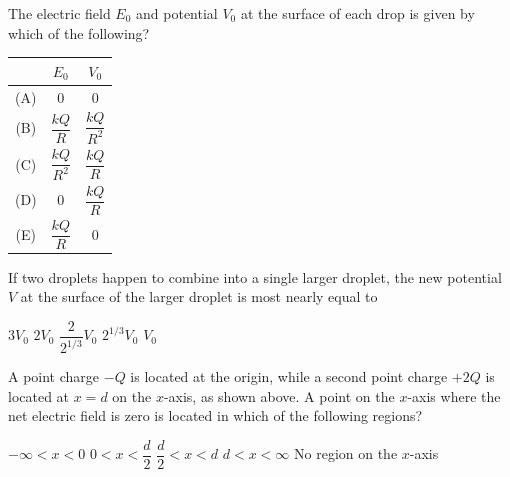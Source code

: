 \documentclass[12pt]{../../oss-apphys-exam}
\begin{document}
\begin{questions}

  \question The electric field $E_0$ and potential $V_0$ at the surface of each
  drop is given by which of the following?
  \label{rain1}
  
  \begin{tabular}{ccc}
    & $E_0$ & $V_0$ \\ \hline
    (A) & 0 & 0 \\
    (B) & $\dfrac{kQ}R$ & $\dfrac{kQ}{R^2}$ \\
    (C) & $\dfrac{kQ}{R^2}$ & $\dfrac{kQ}R$ \\
    (D) & 0 & $\dfrac{kQ}R$ \\
    (E) & $\dfrac{kQ}R$ & 0
  \end{tabular}
  
  \question If two droplets happen to combine into a single larger droplet, the
  new potential $V$ at the surface of the larger droplet is most nearly equal to
  \label{rain2}
  \begin{choices}
    \choice $3V_0$
    \choice $2V_0$
    \choice $\dfrac2{2^{1/3}}V_0$
    \choice $2^{1/3}V_0$
    \choice $V_0$
  \end{choices}
  \newpage
  
  \question A point charge $-Q$ is located at the origin, while a second point
  charge $+2Q$ is located at $x=d$ on the $x$-axis, as shown above. A point on
  the $x$-axis where the net electric field is zero is located in which of the
  following regions?
  \begin{choices}
    \choice $-\infty<x<0$
    \choice $0<x<\dfrac d2$
    \choice $\dfrac d2<x<d$
    \choice $d<x<\infty$
    \choice No region on the $x$-axis
  \end{choices}
  

\end{questions}
\end{document}
